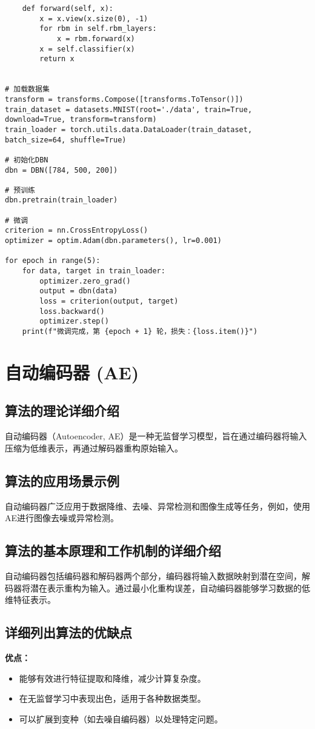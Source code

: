 \begin{lstlisting}
    def forward(self, x):
        x = x.view(x.size(0), -1)
        for rbm in self.rbm_layers:
            x = rbm.forward(x)
        x = self.classifier(x)
        return x


# 加载数据集
transform = transforms.Compose([transforms.ToTensor()])
train_dataset = datasets.MNIST(root='./data', train=True, download=True, transform=transform)
train_loader = torch.utils.data.DataLoader(train_dataset, batch_size=64, shuffle=True)

# 初始化DBN
dbn = DBN([784, 500, 200])

# 预训练
dbn.pretrain(train_loader)

# 微调
criterion = nn.CrossEntropyLoss()
optimizer = optim.Adam(dbn.parameters(), lr=0.001)

for epoch in range(5):
    for data, target in train_loader:
        optimizer.zero_grad()
        output = dbn(data)
        loss = criterion(output, target)
        loss.backward()
        optimizer.step()
    print(f"微调完成，第 {epoch + 1} 轮，损失：{loss.item()}")

\end{lstlisting}


\section{自动编码器 (AE)}
\subsection*{算法的理论详细介绍}
自动编码器（Autoencoder, AE）是一种无监督学习模型，旨在通过编码器将输入压缩为低维表示，再通过解码器重构原始输入。

\subsection*{算法的应用场景示例}
自动编码器广泛应用于数据降维、去噪、异常检测和图像生成等任务，例如，使用AE进行图像去噪或异常检测。

\subsection*{算法的基本原理和工作机制的详细介绍}
自动编码器包括编码器和解码器两个部分，编码器将输入数据映射到潜在空间，解码器将潜在表示重构为输入。通过最小化重构误差，自动编码器能够学习数据的低维特征表示。

\subsection*{详细列出算法的优缺点}
\textbf{优点：}
\begin{itemize}
    \item 能够有效进行特征提取和降维，减少计算复杂度。
    \item 在无监督学习中表现出色，适用于各种数据类型。
    \item 可以扩展到变种（如去噪自编码器）以处理特定问题。
\end{itemize}


